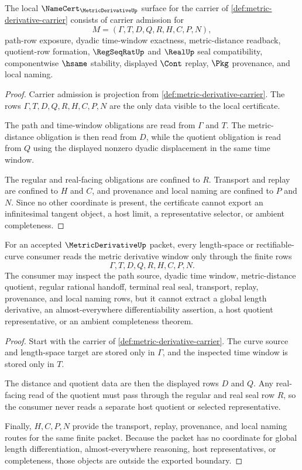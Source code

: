 \begin{theorem}
\label{thm:metric-derivative-namecert-obligations}
The local $\NameCert_{\MetricDerivativeUp}$ surface for the carrier of \autoref{def:metric-derivative-carrier} consists of carrier admission for
$$
M=(\Gamma,T,D,Q,R,H,C,P,N),
$$
path-row exposure, dyadic time-window exactness, metric-distance readback, quotient-row formation, $\RegSeqRatUp$ and $\RealUp$ seal compatibility, componentwise $\hsame$ stability, displayed $\Cont$ replay, $\Pkg$ provenance, and local naming.
\end{theorem}
\begin{proof}
Carrier admission is projection from \autoref{def:metric-derivative-carrier}. The rows $\Gamma,T,D,Q,R,H,C,P,N$ are the only data visible to the local certificate.

The path and time-window obligations are read from $\Gamma$ and $T$. The metric-distance obligation is then read from $D$, while the quotient obligation is read from $Q$ using the displayed nonzero dyadic displacement in the same time window.

The regular and real-facing obligations are confined to $R$. Transport and replay are confined to $H$ and $C$, and provenance and local naming are confined to $P$ and $N$. Since no other coordinate is present, the certificate cannot export an infinitesimal tangent object, a host limit, a representative selector, or ambient completeness.
\end{proof}

\begin{theorem}
\label{thm:metric-derivative-length-window-boundary}
For an accepted $\MetricDerivativeUp$ packet, every length-space or rectifiable-curve consumer reads the metric derivative window only through the finite rows
$$
\Gamma,T,D,Q,R,H,C,P,N.
$$
The consumer may inspect the path source, dyadic time window, metric-distance quotient, regular rational handoff, terminal real seal, transport, replay, provenance, and local naming rows, but it cannot extract a global length derivative, an almost-everywhere differentiability assertion, a host quotient representative, or an ambient completeness theorem.
\end{theorem}
\begin{proof}
Start with the carrier of \autoref{def:metric-derivative-carrier}. The curve source and length-space target are stored only in $\Gamma$, and the inspected time window is stored only in $T$.

The distance and quotient data are then the displayed rows $D$ and $Q$. Any real-facing read of the quotient must pass through the regular and real seal row $R$, so the consumer never reads a separate host quotient or selected representative.

Finally, $H,C,P,N$ provide the transport, replay, provenance, and local naming routes for the same finite packet. Because the packet has no coordinate for global length differentiation, almost-everywhere reasoning, host representatives, or completeness, those objects are outside the exported boundary.
\end{proof}

